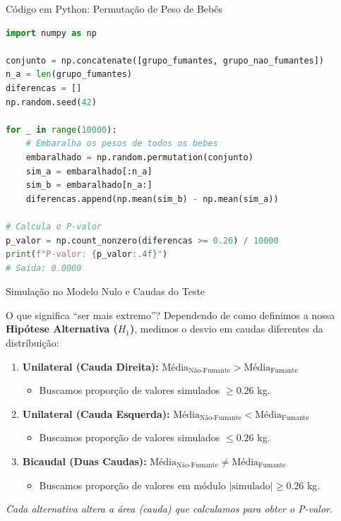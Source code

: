 \begin{frame}[fragile]{Código em Python: Permutação de Peso de Bebês}
\begin{lstlisting}[language=Python]
import numpy as np

conjunto = np.concatenate([grupo_fumantes, grupo_nao_fumantes])
n_a = len(grupo_fumantes)
diferencas = []
np.random.seed(42)

for _ in range(10000):
    # Embaralha os pesos de todos os bebes
    embaralhado = np.random.permutation(conjunto)
    sim_a = embaralhado[:n_a]
    sim_b = embaralhado[n_a:]
    diferencas.append(np.mean(sim_b) - np.mean(sim_a))

# Calcula o P-valor
p_valor = np.count_nonzero(diferencas >= 0.26) / 10000
print(f"P-valor: {p_valor:.4f}")
# Saida: 0.0000
\end{lstlisting}
\end{frame}

\begin{frame}{Simulação no Modelo Nulo e Caudas do Teste}
    \begin{block}{O que significa ``ser mais extremo''?}
        Dependendo de como definimos a nossa \textbf{Hipótese Alternativa ($H_1$)}, medimos o desvio em caudas diferentes da distribuição:
        \begin{enumerate}
            \item \textbf{Unilateral (Cauda Direita):} $\text{Média}_{\text{Não-Fumante}} > \text{Média}_{\text{Fumante}}$
            \begin{itemize}
                \item Buscamos proporção de valores simulados $\geq 0.26$ kg.
            \end{itemize}
            \item \textbf{Unilateral (Cauda Esquerda):} $\text{Média}_{\text{Não-Fumante}} < \text{Média}_{\text{Fumante}}$
            \begin{itemize}
                \item Buscamos proporção de valores simulados $\leq 0.26$ kg.
            \end{itemize}
            \item \textbf{Bicaudal (Duas Caudas):} $\text{Média}_{\text{Não-Fumante}} \neq \text{Média}_{\text{Fumante}}$
            \begin{itemize}
                \item Buscamos proporção de valores em módulo $|\text{simulado}| \geq 0.26$ kg.
            \end{itemize}
        \end{enumerate}
    \end{block}
    \centering
    \textit{Cada alternativa altera a área (cauda) que calculamos para obter o P-valor.}
\end{frame}

